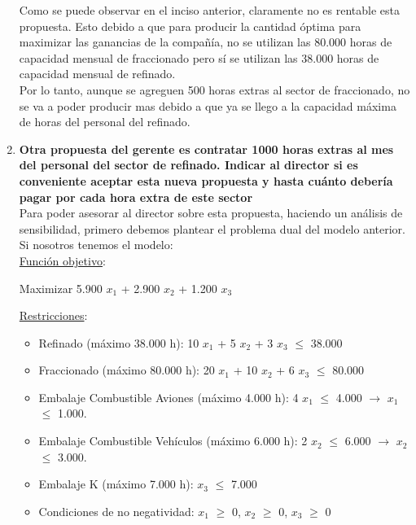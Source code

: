 \documentclass[10pt,a4paper]{article}
\begin{document}
\begin{enumerate}[label=\textbf{\sffamily\large\arabic*.}]
    Como se puede observar en el inciso anterior, claramente no es rentable esta propuesta. Esto debido a que para producir
    la cantidad óptima para maximizar las ganancias de la compañía, no se utilizan las 80.000 horas de capacidad mensual de fraccionado pero sí se 
    utilizan las 38.000 horas de capacidad mensual de refinado. \\

    Por lo tanto, aunque se agreguen 500 horas extras al sector de fraccionado, no se va a poder producir mas debido a que ya se llego a la capacidad
    máxima de horas del personal del refinado.\\

    \item {\bfseries\large Otra propuesta del gerente es contratar 1000 horas extras al mes del personal del sector de refinado. Indicar
    al director si es conveniente aceptar esta nueva propuesta y hasta cuánto debería pagar por cada hora extra
    de este sector}\\

    Para poder asesorar al director sobre esta propuesta, haciendo un análisis de sensibilidad, primero debemos plantear el problema 
    dual del modelo anterior.\\

    Si nosotros tenemos el modelo:\\

    \underline{Función objetivo}: 

    \begin{center}
        
        Maximizar 5.900 $x_{1}$ + 2.900 $x_{2}$ + 1.200 $x_{3}$

    \end{center}

    \clearpage

    \underline{Restricciones}: 

    \begin{itemize}

        \item Refinado (máximo 38.000 h): 10 $x_{1}$ + 5 $x_{2}$ + 3 $x_{3}$ $\leq$ 38.000
        \item Fraccionado (máximo 80.000 h): 20 $x_{1}$ + 10 $x_{2}$ + 6 $x_{3}$ $\leq$ 80.000
        \item Embalaje Combustible Aviones (máximo 4.000 h): 4 $x_{1}$ $\leq$ 4.000 $\rightarrow$ $x_{1}$ $\leq$ 1.000.
        \item Embalaje Combustible Vehículos (máximo 6.000 h): 2 $x_{2}$ $\leq$ 6.000 $\rightarrow$ $x_{2}$ $\leq$ 3.000.
        \item Embalaje K (máximo 7.000 h): $x_{3}$ $\leq$ 7.000
        \item Condiciones de no negatividad: $x_{1}$ $\geq$ 0, $x_{2}$ $\geq$ 0, $x_{3}$ $\geq$ 0\\


\end{itemize}
\end{enumerate}
\end{document}
